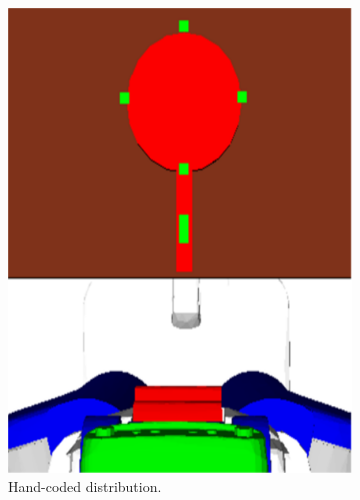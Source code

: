 \begin{figure}[h!]
  \centering
  \begin{subfigure}[b]{0.25\linewidth}
    \includegraphics[width=\textwidth]{images/frying_hand.png}
    \caption{Hand-coded distribution.}
  \end{subfigure}
  \begin{subfigure}[b]{0.25\linewidth}

\end{subfigure}
\end{figure}

